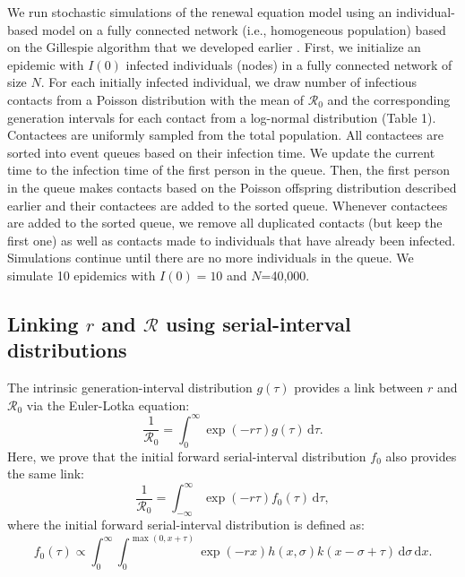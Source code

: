 \documentclass[12pt]{article}
\newcommand{\Rx}[1]{\ensuremath{{\mathcal R}_{#1}}\xspace}
\newcommand{\Ro}{\Rx{0}}
\newcommand{\RR}{\ensuremath{{\mathcal R}}\xspace}
\newcommand{\dd}[1]{\ensuremath{\, \mathrm{d}#1}}
\newcommand{\dtau}{\dd{\tau}}
\newcommand{\dx}{\dd{x}}
\newcommand{\dsigma}{\dd{\sigma}}
\newcommand{\gdist}{g} %
\begin{document}
We run stochastic simulations of the renewal equation model using an individual-based model on a fully connected network (i.e., homogeneous population) based on the Gillespie algorithm that we developed earlier \citep{park2019inferring}.
First, we initialize an epidemic with $I(0)$ infected individuals (nodes) in a fully connected network of size $N$. 
For each initially infected individual, we draw number of infectious contacts from a Poisson distribution with the mean of \Ro and the corresponding generation intervals for each contact from a log-normal distribution (Table 1).
Contactees are uniformly sampled from the total population.
All contactees are sorted into event queues based on their infection time.
We update the current time to the infection time of the first person in the queue.
Then, the first person in the queue makes contacts based on the Poisson offspring distribution described earlier and their contactees are added to the sorted queue.
Whenever contactees are added to the sorted queue, we remove all duplicated contacts (but keep the first one) as well as contacts made to individuals that have already been infected.
Simulations continue until there are no more individuals in the queue.
We simulate 10 epidemics with $I(0)=10$ and $N$=40,000.

\subsection{Linking $r$ and \RR using serial-interval distributions}

The intrinsic generation-interval distribution $\gdist(\tau)$ provides a link between $r$ and \Ro via the Euler-Lotka equation:
\begin{equation}
\frac{1}{\Ro} = \int_0^\infty \exp(-r\tau) \gdist(\tau) \dtau.
\end{equation}
Here, we prove that the initial forward serial-interval distribution $f_0$ also provides the same link:
\begin{equation}
\frac{1}{\Ro} = \int_{-\infty}^\infty \exp(-r\tau) f_{0}(\tau) \dtau,
\end{equation}
where the initial forward serial-interval distribution is defined as:
\begin{equation}
f_{0}(\tau) \propto \int_{0}^{\infty} \int_{0}^{\max(0,x+\tau)} \exp(-rx) h(x, \sigma) k(x-\sigma+\tau) \dsigma\dx.
\end{equation}
\end{document}
